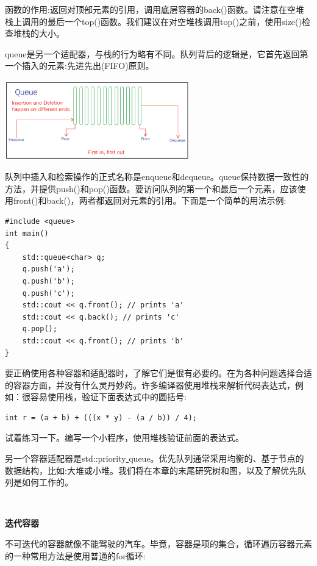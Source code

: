 函数的作用:返回对顶部元素的引用，调用底层容器的back()函数。请注意在空堆栈上调用的最后一个top()函数。我们建议在对空堆栈调用top()之前，使用size()检查堆栈的大小。 \par
queue是另一个适配器，与栈的行为略有不同。队列背后的逻辑是，它首先返回第一个插入的元素:先进先出(FIFO)原则。 \par

\begin{center}
	\includegraphics[width=0.6\textwidth]{content/Section-2/Chapter-6/17}
\end{center}

队列中插入和检索操作的正式名称是enqueue和dequeue。queue保持数据一致性的方法，并提供push()和pop()函数。要访问队列的第一个和最后一个元素，应该使用front()和back()，两者都返回对元素的引用。下面是一个简单的用法示例: \par

\begin{lstlisting}[caption={}]
#include <queue>
int main()
{
	std::queue<char> q;
	q.push('a');
	q.push('b');
	q.push('c');
	std::cout << q.front(); // prints 'a'
	std::cout << q.back(); // prints 'c'
	q.pop();
	std::cout << q.front(); // prints 'b'
}
\end{lstlisting}

要正确使用各种容器和适配器时，了解它们是很有必要的。在为各种问题选择合适的容器方面，并没有什么灵丹妙药。许多编译器使用堆栈来解析代码表达式，例如：很容易使用栈，验证下面表达式中的圆括号: \par

\begin{lstlisting}[caption={}]
int r = (a + b) + (((x * y) - (a / b)) / 4);
\end{lstlisting}

试着练习一下。编写一个小程序，使用堆栈验证前面的表达式。 \par
另一个容器适配器是std::priority\underline{ }queue。优先队列通常采用均衡的、基于节点的数据结构，比如:大堆或小堆。我们将在本章的末尾研究树和图，以及了解优先队列是如何工作的。 \par

\noindent\textbf{}\ \par
\textbf{迭代容器} \ \par
不可迭代的容器就像不能驾驶的汽车。毕竟，容器是项的集合，循环遍历容器元素的一种常用方法是使用普通的for循环: \par

